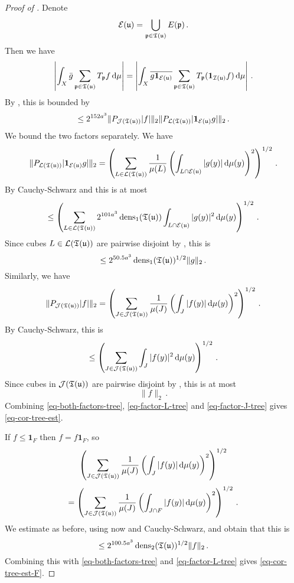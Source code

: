 \begin{proof}[Proof of ]
    Denote
    $$
        \mathcal{E}({\mathfrak u}) = \bigcup_{{\mathfrak p} \in {\mathfrak T}({\mathfrak u})} E({\mathfrak p})\,.
    $$
    Then we have
    $$
        \left| \int_X \bar g \sum_{{\mathfrak p} \in {\mathfrak T}({\mathfrak u})} T_{{\mathfrak p}} f \, \mathrm{d}\mu \right| = \left| \int_X \overline{ g\mathbf{1}_{\mathcal{E}({\mathfrak u})}} \sum_{{\mathfrak p} \in {\mathfrak T}({\mathfrak u})} T_{{\mathfrak p}} (\mathbf{1}_{{\mathcal{I}}({\mathfrak u})}f) \, \mathrm{d}\mu \right|\,.
    $$
    By , this is bounded by
    \begin{equation}
        \label{eq-both-factors-tree}
        \le 2^{152a^3}\|P_{\mathcal{J}({\mathfrak T}({\mathfrak u}))}|f|\|_2 \|P_{\mathcal{L}({\mathfrak T}({\mathfrak u}))} |\mathbf{1}_{\mathcal{E}({\mathfrak u})}g|\|_2\,.
    \end{equation}
    We bound the two factors separately.
    We have
    $$
        \|P_{\mathcal{L}({\mathfrak T}({\mathfrak u}))} |\mathbf{1}_{\mathcal{E}({\mathfrak u})}g|\|_2 = \left( \sum_{L \in \mathcal{L}({\mathfrak T}({\mathfrak u}))} \frac{1}{\mu(L)} \left(\int_{L \cap \mathcal{E}({\mathfrak u})} |g(y)| \, \mathrm{d}\mu(y)\right)^2 \right)^{1/2}\,.
    $$
    By Cauchy-Schwarz and  this is at most
    $$
        \le \left( \sum_{L \in \mathcal{L}({\mathfrak T}({\mathfrak u}))} 2^{101a^3} \operatorname{\operatorname{dens}}_1({\mathfrak T}({\mathfrak u})) \int_{L \cap \mathcal{E}({\mathfrak u})} |g(y)|^2 \, \mathrm{d}\mu(y) \right)^{1/2}\,.
    $$
    Since cubes $L \in \mathcal{L}({\mathfrak T}({\mathfrak u}))$ are pairwise disjoint by , this is
    \begin{equation}
        \label{eq-factor-L-tree}
         \le 2^{50.5 a^3} \operatorname{\operatorname{dens}}_1({\mathfrak T}({\mathfrak u}))^{1/2} \|g\|_2\,.
    \end{equation}
    Similarly, we have
    \begin{equation}
        \label{eq-cor-tree-proof}
        \|P_{\mathcal{J}({\mathfrak T}({\mathfrak u}))}|f|\|_2 = \left( \sum_{J \in \mathcal{J}({\mathfrak T}({\mathfrak u}))} \frac{1}{\mu(J)} \left(\int_J |f(y)| \, \mathrm{d}\mu(y)\right)^2 \right)^{1/2}\,.
    \end{equation}
    By Cauchy-Schwarz, this is
    $$
        \le \left( \sum_{J \in \mathcal{J}({\mathfrak T}({\mathfrak u}))} \int_J |f(y)|^2 \, \mathrm{d}\mu(y) \right)^{1/2}\,.
    $$
    Since cubes in $\mathcal{J}({\mathfrak T}({\mathfrak u}))$ are pairwise disjoint by , this is at most
    \begin{equation}
        \label{eq-factor-J-tree}
        \|f\|_2\,.
    \end{equation}
    Combining \eqref{eq-both-factors-tree}, \eqref{eq-factor-L-tree} and \eqref{eq-factor-J-tree} gives \eqref{eq-cor-tree-est}.

    If $f \le \mathbf{1}_F$ then $f = f\mathbf{1}_F$, so
    $$
        \left( \sum_{J \in \mathcal{J}({\mathfrak T}({\mathfrak u}))} \frac{1}{\mu(J)} \left(\int_J |f(y)| \, \mathrm{d}\mu(y)\right)^2 \right)^{1/2}
    $$
    $$
        =\left(\sum_{J \in \mathcal{J}({\mathfrak T}({\mathfrak u}))} \frac{1}{\mu(J)} \left(\int_{J \cap F} |f(y)| \, \mathrm{d}\mu(y)\right)^2 \right)^{1/2}\,.
    $$
    We estimate as before, using now  and Cauchy-Schwarz, and obtain that this is
    $$
        \le 2^{100.5a^3} \operatorname{\operatorname{dens}}_2({\mathfrak T}({\mathfrak u}))^{1/2} \|f\|_2\,.
    $$
    Combining this with \eqref{eq-both-factors-tree} and \eqref{eq-factor-L-tree} gives \eqref{eq-cor-tree-est-F}.
\end{proof}


